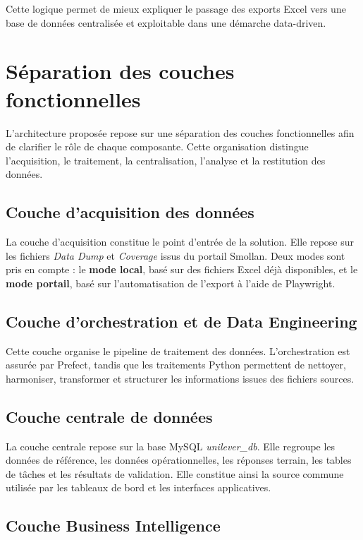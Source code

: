 Cette logique permet de mieux expliquer le passage des exports Excel vers une base de données centralisée et exploitable dans une démarche data-driven.

\section{Séparation des couches fonctionnelles}

L’architecture proposée repose sur une séparation des couches fonctionnelles afin de clarifier le rôle de chaque composante. Cette organisation distingue l’acquisition, le traitement, la centralisation, l’analyse et la restitution des données.

\subsection{Couche d’acquisition des données}

La couche d’acquisition constitue le point d’entrée de la solution. Elle repose sur les fichiers \textit{Data Dump} et \textit{Coverage} issus du portail Smollan. Deux modes sont pris en compte : le \textbf{mode local}, basé sur des fichiers Excel déjà disponibles, et le \textbf{mode portail}, basé sur l’automatisation de l’export à l’aide de Playwright.

\subsection{Couche d’orchestration et de Data Engineering}

Cette couche organise le pipeline de traitement des données. L’orchestration est assurée par Prefect, tandis que les traitements Python permettent de nettoyer, harmoniser, transformer et structurer les informations issues des fichiers sources.

\subsection{Couche centrale de données}

La couche centrale repose sur la base MySQL \textit{unilever\_db}. Elle regroupe les données de référence, les données opérationnelles, les réponses terrain, les tables de tâches et les résultats de validation. Elle constitue ainsi la source commune utilisée par les tableaux de bord et les interfaces applicatives.

\subsection{Couche Business Intelligence}


